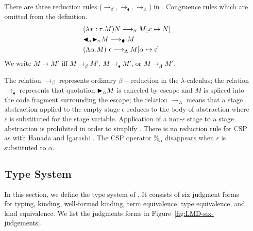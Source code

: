 \begin{definition}[Reduction]
	There are three reduction rules ($\longrightarrow_\beta, \longrightarrow_\blacklozenge, \longrightarrow_\Lambda$) in \LMD.
	Congruence rules which are omitted from the definition.
	\begin{align*}
		 & (\lambda x:\tau.M) N \longrightarrow_\beta M[x \mapsto N]                       \\
		 & {\mathop{\blacktriangleleft}}_\alpha {\mathop{\blacktriangleright}}_\alpha M \longrightarrow_\blacklozenge M                        \\
		 & (\Lambda \alpha.M)\ \epsilon \longrightarrow_\Lambda M[\alpha \mapsto \epsilon]
	\end{align*}
	We write $ M \longrightarrow M'$ iff $ M \longrightarrow_\beta M'$, $ M \longrightarrow_\blacklozenge M'$, or $ M \longrightarrow_\Lambda M'$.
\end{definition}

The relation $\longrightarrow_\beta$ represents ordinary $\beta-$reduction in the \(\lambda\)-calculus; the relation 
$\longrightarrow_\blacklozenge$ represents that quotation ${\mathop{\blacktriangleright}}_\alpha M$ is canceled by escape and $M$ is spliced into the code fragment surrounding the escape;
the relation $\longrightarrow_\Lambda$ means that a stage abstraction applied to the empty stage $\epsilon$ reduces to the body of abstraction
where $\epsilon$ is substituted for the stage variable.
Application of a non-$\epsilon$ stage to a stage abstraction is prohibited in order to simplify \LMD. 
There is no reduction rule for CSP as with Hanada and Igarashi \cite{Hanada2014}.
The CSP operator $\%_\alpha$ disappears when $\epsilon$ is substituted to $\alpha$.


\subsection{Type System}


In this section, we define the type system of \LMD.
It consists of six judgment forms for typing, kinding, well-formed kinding, term equivalence, type equivalence, and kind equivalence.
We list the judgments forms in Figure~\ref{fig:LMD-six-judgements}.

